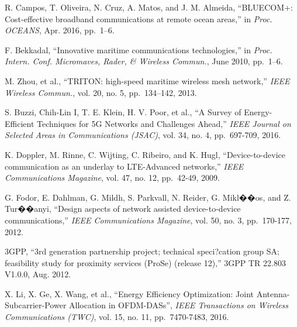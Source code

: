 \documentclass{ieeeaccess}
\begin{document}
\begin{thebibliography}{10}
  
  
  
  R. Campos, T. Oliveira, N. Cruz, A. Matos, and J. M. Almeida,
  ``BLUECOM+: Cost-effective broadband communications at remote ocean areas,'' in
  \emph{Proc. OCEANS}, Apr. 2016, pp.~1--6.
  
  F. Bekkadal, ``Innovative maritime communications technologies,'' in
  \emph{Proc. Intern. Conf. Micromaves, Rader, \& Wireless Commun.}, June 2010, pp.~1--6.
  
  M. Zhou, et al., ``TRITON: high-speed maritime wireless mesh network,''
  \emph{IEEE Wireless Commun.}, vol. 20, no. 5, pp.~134--142, 2013.
  
  
  S. Buzzi, Chih-Lin I, T. E. Klein, H. V. Poor, et al., ``A Survey of Energy-Efficient Techniques for 5G Networks and Challenges Ahead,''
  \emph{IEEE Journal on Selected Areas in Communications (JSAC)}, vol. 34, no. 4, pp.~697-709, 2016.
  
  K. Doppler, M. Rinne, C. Wijting, C. Ribeiro, and K. Hugl, ``Device-to-device communication as an underlay to LTE-Advanced networks,''
    \emph{IEEE Communications Magazine}, vol. 47, no. 12, pp.~42-49, 2009.
   
  G. Fodor, E. Dahlman, G. Mildh, S. Parkvall, N. Reider, G. Mikl��os, and Z. Tur��anyi, ``Design aspects of network assisted device-to-device communications,''
    \emph{IEEE Communications Magazine}, vol. 50, no. 3, pp.~170-177, 2012.
     
   3GPP, ``3rd generation partnership project; technical speci?cation group SA; feasibility study for proximity services (ProSe) (release 12),'' 3GPP TR 22.803 V1.0.0, Aug. 2012.
  
  X. Li, X. Ge, X. Wang, et al., ``Energy Efficiency Optimization: Joint Antenna-Subcarrier-Power Allocation in OFDM-DASs'',
  \emph{IEEE Transactions on Wireless Communications (TWC)}, vol. 15, no. 11, pp.~7470-7483, 2016.
  

\end{thebibliography}
\end{document}
